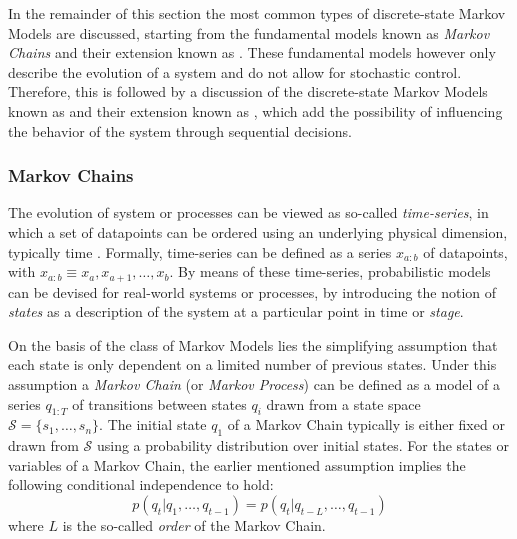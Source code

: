 In the remainder of this section the most common types of discrete-state Markov Models are discussed, starting from the fundamental models known as \textit{Markov Chains} and their extension known as \textit{}.
These fundamental models however only describe the evolution of a system and do not allow for stochastic control.
Therefore, this is followed by a discussion of the discrete-state Markov Models known as \textit{} and their extension known as \textit{}, which add the possibility of influencing the behavior of the system through sequential decisions.


\newpage

\subsubsection{Markov Chains}
\label{sec:markov-chains}

The evolution of system or processes can be viewed as so-called \textit{time-series}, in which a set of datapoints can be ordered using an underlying physical dimension, typically time \cite{barberBRML2012}.
Formally, time-series can be defined as a series $x_{a:b}$ of datapoints, with $x_{a:b} \equiv x_a, x_{a+1}, \ldots, x_b$.
By means of these time-series, probabilistic models can be devised for real-world systems or processes, by introducing the notion of \textit{states} as a description of the system at a particular point in time or \textit{stage}.

On the basis of the class of Markov Models lies the simplifying assumption that each state is only dependent on a limited number of previous states.
Under this assumption a \textit{Markov Chain} (or \textit{Markov Process}) can be defined as a model of a series $q_{1:T}$ of transitions between states $q_i$ drawn from a state space $\mathcal{S} = \{s_1,\ldots,s_n\}$. The initial state $q_1$ of a Markov Chain typically is either fixed or drawn from $\mathcal{S}$ using a probability distribution over initial states.
For the states or variables of a Markov Chain, the earlier mentioned assumption implies the following conditional independence to hold:
\begin{equation}
p(q_t \vert q_1,\ldots,q_{t-1}) = p(q_t \vert q_{t - L}, \ldots, q_{t-1})
\end{equation}
where $L$ is the so-called \textit{order} of the Markov Chain.

